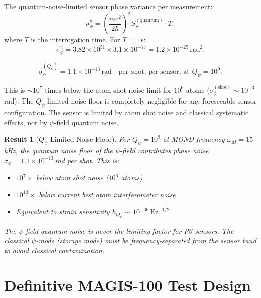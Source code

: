 \documentclass[11pt]{article}
\newtheorem{result}[theorem]{Result}
\theoremstyle{definition}
\theoremstyle{remark}
\newcommand{\Qpsi}{Q_\psi}
\begin{document}
The quantum-noise-limited sensor phase variance per measurement:
\begin{equation}
\sigma_\phi^2 = \left(\frac{mc^2}{2\hbar}\right)^2 S_\psi^{(\mathrm{quantum})} \cdot T,
\end{equation}
where $T$ is the interrogation time. For $T = 1$\,s:
\begin{equation}
\sigma_\phi^2 = 3.82 \times 10^{51} \times 3.1 \times 10^{-77}
= 1.2 \times 10^{-25}\,\mathrm{rad}^2.
\end{equation}

\begin{equation}
\boxed{\sigma_\phi^{(\Qpsi)} = 1.1 \times 10^{-13}\,\mathrm{rad}
\quad\text{per shot, per sensor, at } \Qpsi = 10^9.}
\label{eq:noise-floor}
\end{equation}

This is $\sim 10^7$ times below the atom shot noise limit for $10^6$
atoms ($\sigma_\phi^{(\mathrm{shot})} \sim 10^{-3}$\,rad). The
$\Qpsi$-limited noise floor is completely negligible for any foreseeable
sensor configuration. The sensor is limited by atom shot noise and
classical systematic effects, not by $\psi$-field quantum noise.

\begin{result}[$\Qpsi$-Limited Noise Floor]\label{res:noise-floor}
For $\Qpsi = 10^9$ at MOND frequency $\omega_M = 15$\,kHz, the
quantum noise floor of the $\psi$-field contributes phase noise
$\sigma_\phi = 1.1 \times 10^{-13}$\,rad per shot. This is:
\begin{itemize}
\item $10^7\times$ below atom shot noise ($10^6$ atoms)
\item $10^{10}\times$ below current best atom interferometer noise
\item Equivalent to strain sensitivity
$h_{\Qpsi} \sim 10^{-36}\,\mathrm{Hz}^{-1/2}$
\end{itemize}
The $\psi$-field quantum noise is never the limiting factor for
P6 sensors. The classical $\psi$-mode (storage mode) must be
frequency-separated from the sensor band to avoid classical
contamination.
\end{result}

\section{Definitive MAGIS-100 Test Design}
\label{sec:magis100}
\end{document}

